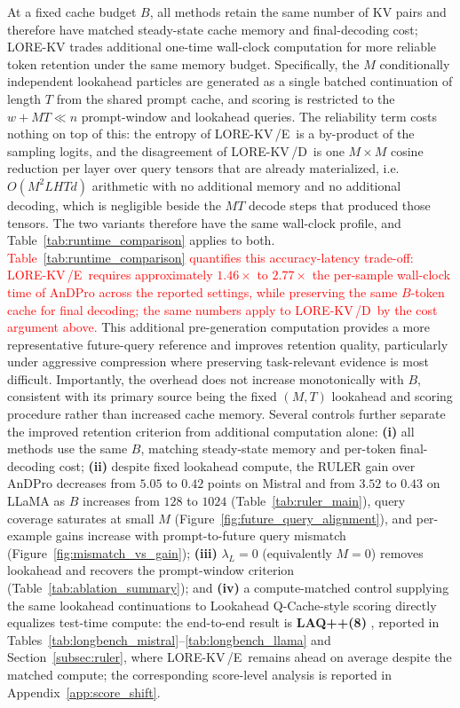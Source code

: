 \documentclass{article} %
\newcommand{\lorekvE}{LORE-KV\,/E}
\newcommand{\lorekvD}{LORE-KV\,/D}
\begin{document}
At a fixed cache budget $B$, all methods retain the same number of KV pairs and therefore have matched steady-state cache memory and final-decoding cost; LORE-KV trades additional one-time wall-clock computation for more reliable token retention under the same memory budget. Specifically, the $M$ conditionally independent lookahead particles are generated as a single batched continuation of length $T$ from the shared prompt cache, and scoring is restricted to the $w+MT\ll n$ prompt-window and lookahead queries. The reliability term costs nothing on top of this: the entropy of \lorekvE\ is a by-product of the sampling logits, and the disagreement of \lorekvD\ is one $M\times M$ cosine reduction per layer over query tensors that are already materialized, i.e.\ $O(M^2LHTd)$ arithmetic with no additional memory and no additional decoding, which is negligible beside the $MT$ decode steps that produced those tensors. The two variants therefore have the same wall-clock profile, and Table~\ref{tab:runtime_comparison} applies to both. \textcolor{red}{Table~\ref{tab:runtime_comparison} quantifies this accuracy-latency trade-off: \lorekvE\ requires approximately $1.46\times$ to $2.77\times$ the per-sample wall-clock time of AnDPro across the reported settings, while preserving the same $B$-token cache for final decoding; the same numbers apply to \lorekvD\ by the cost argument above.} This additional pre-generation computation provides a more representative future-query reference and improves retention quality, particularly under aggressive compression where preserving task-relevant evidence is most difficult. Importantly, the overhead does not increase monotonically with $B$, consistent with its primary source being the fixed $(M,T)$ lookahead and scoring procedure rather than increased cache memory. Several controls further separate the improved retention criterion from additional computation alone: \textbf{(i)} all methods use the same $B$, matching steady-state memory and per-token final-decoding cost; \textbf{(ii)} despite fixed lookahead compute, the RULER gain over AnDPro decreases from $5.05$ to $0.42$ points on Mistral and from $3.52$ to $0.43$ on LLaMA as $B$ increases from $128$ to $1024$ (Table~\ref{tab:ruler_main}), query coverage saturates at small $M$ (Figure~\ref{fig:future_query_alignment}), and per-example gains increase with prompt-to-future query mismatch (Figure~\ref{fig:mismatch_vs_gain}); \textbf{(iii)} $\lambda_L=0$ (equivalently $M=0$) removes lookahead and recovers the prompt-window criterion (Table~\ref{tab:ablation_summary}); and \textbf{(iv)} a compute-matched control supplying the same lookahead continuations to Lookahead Q-Cache-style scoring directly equalizes test-time compute: the end-to-end result is \textbf{LAQ++(8)} \citep{wang2025lookahead}, reported in Tables~\ref{tab:longbench_mistral}--\ref{tab:longbench_llama} and Section~\ref{subsec:ruler}, where \lorekvE\ remains ahead on average despite the matched compute; the corresponding score-level analysis is reported in Appendix~\ref{app:score_shift}.
\end{document}
